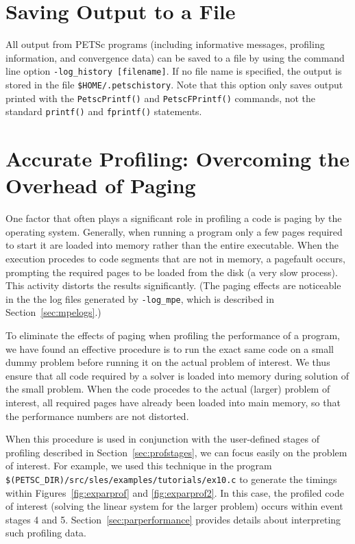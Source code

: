 \section{Saving Output to a File}

All output from PETSc programs (including informative messages, profiling information,
and convergence data) can be saved to a file by using the command line
option {\tt -log\_history [filename]}. 
If no file name is specified, the output is stored in the file {\tt \$HOME/.petschistory}.
 Note that this option only saves output printed with 
the {\tt PetscPrintf()} and {\tt PetscFPrintf()} commands, not the
standard {\tt printf()} and {\tt fprintf()} statements. 
 

\section{Accurate Profiling: Overcoming the Overhead of Paging}
\label{sec:profaccuracy}

One factor that often plays a significant role in profiling a code is
paging by the operating system.  Generally, when running a program
only a few pages required to start it are loaded into memory rather
than the entire executable.  When the execution procedes to code
segments that are not in memory, a pagefault occurs, prompting the
required pages to be loaded from the disk (a very slow process).  This
activity distorts the results significantly. (The paging effects are
noticeable in the the log files generated by {\tt -log\_mpe}, which is
described in Section~\ref{sec:mpelogs}.)

To eliminate the effects of paging when profiling the performance of a
program, we have found an effective procedure is to run the exact same
code on a small dummy problem before running it on the actual problem
of interest. We thus ensure that all code required by a solver is
loaded into memory during solution of the small problem.  When the
code procedes to the actual (larger) problem of interest, all required
pages have already been loaded into main memory, so that the
performance numbers are not distorted.

When this procedure is used in conjunction with the user-defined stages of profiling
described in Section~\ref{sec:profstages}, we can focus easily on the
problem of interest.  For example, we used this technique in the program
{\tt \$(PETSC\_DIR)/src/sles/examples/tutorials/ex10.c} to
generate the timings within Figures~\ref{fig:exparprof} and \ref{fig:exparprof2}.
In this case,
the profiled code of interest (solving the linear system for the larger problem)
occurs within event stages 4 and 5.  Section~\ref{sec:parperformance} provides
details about interpreting such profiling data.

